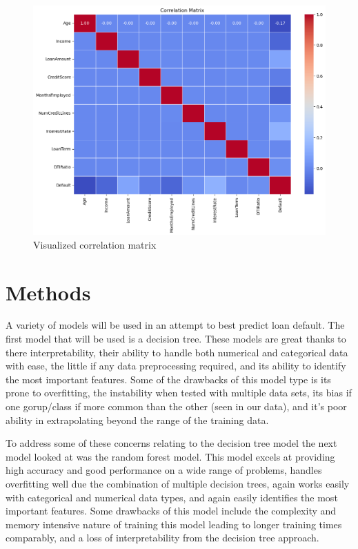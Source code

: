 \documentclass[12pt]{article}
\begin{document}
\begin{figure}[htbp]
    \centering
    \includegraphics[width=\linewidth]{./code/fancycorrelationmatrix.png}
    \caption{Visualized correlation matrix}
    \label{fig:corrmatrix}
\end{figure}

\section{Methods}
\label{sec:meth}

A variety of models will be used in an attempt to best predict loan default. The first model that will be used is a decision tree. These models are great thanks to there interpretability, their ability to handle both numerical and categorical data with ease, the little if any data preprocessing required, and its ability to identify the most important features. Some of the drawbacks of this model type is its prone to overfitting, the instability when tested with multiple data sets, its bias if one gorup/class if more common than the other (seen in our data), and it's poor ability in extrapolating beyond the range of the training data.

To address some of these concerns relating to the decision tree model the next model looked at was the random forest model. This model excels at providing high accuracy and good performance on a wide range of problems, handles overfitting well due the combination of multiple decision trees, again works easily with categorical and numerical data types, and again easily identifies the most important features. Some drawbacks of this model include the complexity and memory intensive nature of training this model leading to longer training times comparably, and a loss of interpretability from the decision tree approach.
\end{document}
